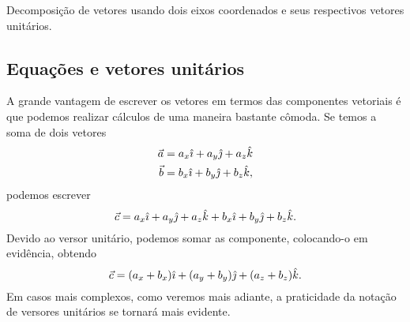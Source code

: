 \begin{marginfigure}
\centering
{}
\caption{Decomposição de vetores usando dois eixos coordenados e seus respectivos vetores unitários.\label{Fig:sis_ref_orto_vers}}
\end{marginfigure}

\subsection{Equações e vetores unitários}

A grande vantagem de escrever os vetores em termos das componentes vetoriais é que podemos realizar cálculos de uma maneira bastante cômoda. Se temos a soma de dois vetores 
\begin{align}
  \vec{a} &= a_x \hat{\imath} + a_y \hat{\jmath} + a_z \hat{k} \\
  \vec{b} &= b_x \hat{\imath} + b_y \hat{\jmath} + b_z \hat{k},
\end{align}
%
podemos escrever
\begin{equation}
  \vec{c} = a_x \hat{\imath} + a_y \hat{\jmath} + a_z \hat{k} + b_x \hat{\imath} + b_y \hat{\jmath} + b_z \hat{k}.
\end{equation}
%
Devido ao versor unitário, podemos somar as componente, colocando-o em evidência, obtendo
\begin{equation}
  \vec{c} = (a_x + b_x) \hat{\imath} + (a_y + b_y) \hat{\jmath} + (a_z + b_z)\hat{k}.
\end{equation}
%
Em casos mais complexos, como veremos mais adiante, a praticidade da notação de versores unitários se tornará mais evidente.

